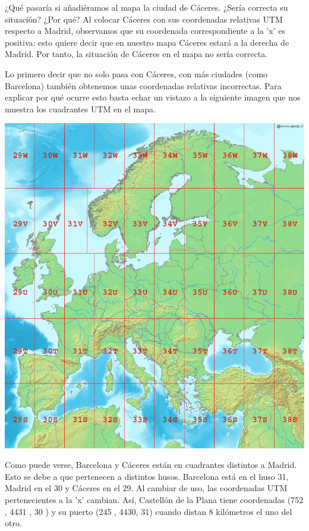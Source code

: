 \documentclass[11pt, a4paper, spanish, openright, twoside]{book}
\begin{document}
	\begin{section}{ ¿Qué pasaría si añadiéramos al mapa la ciudad de Cáceres. ¿Sería correcta su situación? ¿Por qué?}
		Al colocar Cáceres con sus coordenadas relativas UTM respecto a Madrid, observamos que su coordenada correspondiente 
		a la 'x' es positiva: esto quiere decir que en nuestro mapa Cáceres estará a la derecha de Madrid. Por tanto, la situación de Cáceres 
		en el mapa no sería correcta.

		Lo primero decir que no solo pasa con Cáceres,  con más ciudades (como Barcelona) también obtenemos unas coordenadas relativas 
		incorrectas. Para explicar por qué ocurre esto basta echar un vistazo a la siguiente imagen que nos muestra los cuadrantes UTM en
		el mapa.

	\includegraphics[scale=0.45]{mapaUTM}

		Como puede verse, Barcelona y Cáceres están en cuadrantes distintos a Madrid.
		Esto se debe a que pertenecen a distintos husos. Barcelona está en el huso 31, Madrid en el 30 y Cáceres en el 29. Al cambiar de uso, 
		las coordenadas UTM pertenecientes a la 'x' cambian. Así, Castellón de la Plana tiene coordenadas (752 ,  4431 ,  30 ) y su puerto (245  ,  4430, 31) 
		cuando distan 8 kilómetros el uno del otro.

	\end{section}
\end{document}
